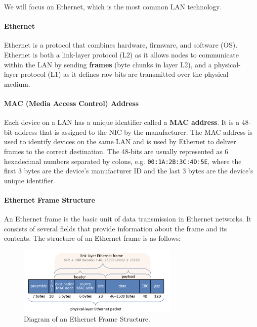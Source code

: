 \documentclass[openany,12pt]{book}
\begin{document}
We will focus on Ethernet, which is the most common LAN technology. 

\paragraph{Ethernet} Ethernet is a protocol that combines hardware, firmware, and software (OS). Ethernet is both a link-layer protocol (L2) as it allows nodes to communicate within the LAN by sending \textbf{frames} (byte chunks in layer L2), and a physical-layer protocol (L1) as it defines raw bits are transmitted over the physical medium.

\paragraph{MAC (Media Access Control) Address} Each device on a LAN has a unique identifier called a \textbf{MAC address}. It is a 48-bit address that is assigned to the NIC by the manufacturer. The MAC address is used to identify devices on the same LAN and is used by Ethernet to deliver frames to the correct destination. The 48-bits are usually represented as 6 hexadecimal numbers separated by colons, e.g. \texttt{00:1A:2B:3C:4D:5E}, where the first 3 bytes are the device's manufacturer ID and the last 3 bytes are the device's unique identifier.




\paragraph{Ethernet Frame Structure} An Ethernet frame is the basic unit of data transmission in Ethernet networks. It consists of several fields that provide information about the frame and its contents. The structure of an Ethernet frame is as follows:

\begin{figure}[H]
\centering
\includegraphics[width=0.7\textwidth]{EthernetFrame.png}
\caption{Diagram of an Ethernet Frame Structure.}
\end{figure}
\end{document}

